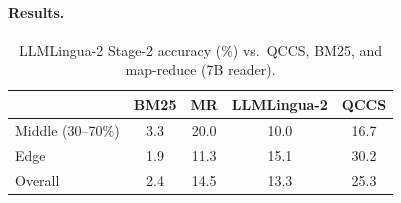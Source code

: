 \documentclass{article}
\begin{document}
\paragraph{Results.}

\begin{table}[H]
\centering
\caption{LLMLingua-2 Stage-2 accuracy (\%) vs.\ QCCS, BM25, and map-reduce (7B reader).}
\label{tab:llmlingua2}
\small
\begin{tabular}{@{}lcccc@{}}
\toprule
 & BM25 & MR & LLMLingua-2 & QCCS \\
\midrule
Middle (30--70\%) & 3.3 & 20.0 & 10.0 & 16.7 \\
Edge              & 1.9 & 11.3 & 15.1 & 30.2 \\
Overall           & 2.4 & 14.5 & 13.3 & 25.3 \\
\bottomrule
\end{tabular}
\end{table}
\end{document}
